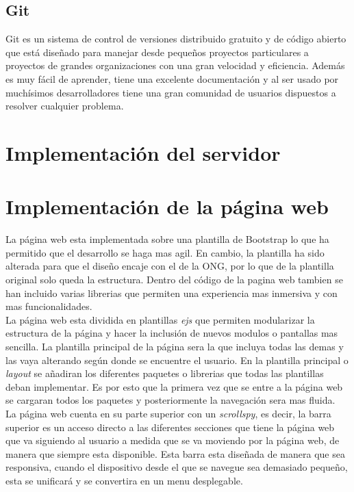\subsection{Git}
Git es un sistema de control de versiones distribuido gratuito y de código abierto que está diseñado para manejar desde pequeños proyectos particulares a proyectos de grandes organizaciones con una gran velocidad y eficiencia. Además es muy fácil de aprender, tiene una excelente documentación y al ser usado por muchísimos desarrolladores tiene una gran comunidad de usuarios dispuestos a resolver cualquier problema.

\section{Implementación del servidor}



\section{Implementación de la página web}
La página web esta implementada sobre una plantilla de Bootstrap lo que ha permitido que el desarrollo se haga mas agil. En cambio, la plantilla ha sido alterada para que el diseño encaje con el de la ONG, por lo que de la plantilla original solo queda la estructura. Dentro del código de la pagina web tambien se han incluido varias librerias que permiten una experiencia mas inmersiva y con mas funcionalidades. \\

La página web esta dividida en plantillas \textit{ejs} que permiten modularizar la estructura de la página y hacer la inclusión de nuevos modulos o pantallas mas sencilla. La plantilla principal de la página sera la que incluya todas las demas y las vaya alterando según donde se encuentre el usuario. En la plantilla principal o \textit{layout} se añadiran los diferentes paquetes o librerias que todas las plantillas deban implementar. Es por esto que la primera vez que se entre a la página web se cargaran todos los paquetes y posteriormente la navegación sera mas fluida.\\

La página web cuenta en su parte superior con un \textit{scrollspy}, es decir, la barra superior es un acceso directo a las diferentes secciones que tiene la página web que va siguiendo al usuario a medida que se va moviendo por la página web, de manera que siempre esta disponible. Esta barra esta diseñada de manera que sea responsiva, cuando el dispositivo desde el que se navegue sea demasiado pequeño, esta se unificará y se convertira en un menu desplegable.\\

